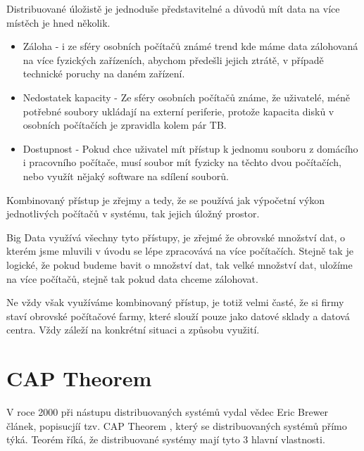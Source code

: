 \documentclass[thesis=M,czech]{FITthesis}[2012/06/26]
\begin{document}
Distribuované úložistě je jednoduše představitelné a důvodů mít data na více místěch je hned několik.
\begin{itemize}
\item Záloha - i ze sféry osobních počítačů známé trend kde máme data zálohovaná na více fyzických zařízeních, abychom předešli jejich ztrátě, v případě technické poruchy na daném zařízení. 

\item Nedostatek kapacity - Ze sféry osobních počítačů známe, že uživatelé, méně potřebné soubory ukládají na externí periferie, protože kapacita disků v osobních počítačích je zpravidla kolem pár TB.

\item Dostupnost - Pokud chce uživatel mít přístup k jednomu souboru z domácího i pracovního počítače, musí soubor mít fyzicky na těchto dvou počítačích, nebo využít nějaký software na sdílení souborů. 

\end{itemize}

Kombinovaný přístup je zřejmy a tedy, že se používá jak výpočetní výkon jednotlivých počítačů v systému, tak jejich úložný prostor. 

Big Data využívá všechny tyto přístupy, je zřejmé že obrovské množství dat, o kterém jsme mluvili v úvodu se lépe zpracovává na více počítačích. Stejně tak je logické, že pokud budeme bavit o množství dat, tak velké množství dat, uložíme na více počítačů, stejně tak pokud data chceme zálohovat. 

Ne vždy však využíváme kombinovaný přístup, je totiž velmi časté, že si firmy staví obrovské počítačové farmy, které slouží pouze jako datové sklady a datová centra. Vždy záleží na konkrétní situaci a způsobu využití. 


\section{CAP Theorem}
V roce 2000 při nástupu distribuovaných systémů vydal vědec Eric Brewer článek, popisucjíí tzv. CAP Theorem \cite{cap}, který se distribuovaných systémů přímo týká. Teorém říká, že distribuované systémy mají tyto 3 hlavní vlastnosti. 
\end{document}
